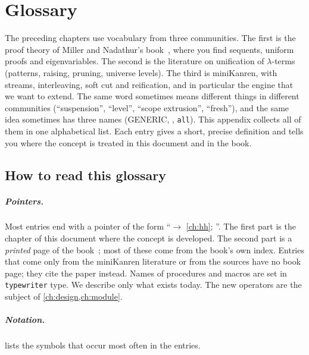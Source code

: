 \chapter{Glossary}\label{app:glossary}

The preceding chapters use vocabulary from three communities. The first is the proof theory of Miller and
Nadathur's book~\cite{MillerNadathur2012}, where you find sequents, uniform proofs and eigenvariables. The second
is the literature on unification of $\lambda$-terms (patterns, raising, pruning, universe levels). The third is
miniKanren, with streams, interleaving, soft cut and reification, and in particular the engine \micro{} that we
want to extend. The same word sometimes means different things in different communities (\enquote{suspension},
\enquote{level}, \enquote{scope extrusion}, \enquote{fresh}), and the same idea sometimes has three names
(GENERIC, , \texttt{all}). This appendix collects all of them in one alphabetical list. Each entry gives a
short, precise definition and tells you where the concept is treated in this document and in the book.

\section{How to read this glossary}\label{sec:glossary-howto}

\paragraph{Pointers.} Most entries end with a pointer of the form
\enquote{$\rightarrow$ \cref{ch:hh}; }. The first part is the chapter of this document where the
concept is developed. The second part is a \emph{printed} page of the book~\cite{MillerNadathur2012}; most of
these come from the book's own index. Entries that come only from the miniKanren literature or from the
\aux{} sources have no book page; they cite the paper instead. Names of \micro{} procedures and macros are set in
\texttt{typewriter} type. We describe only what exists today. The new operators are the subject of
\cref{ch:design,ch:module}.

\paragraph{Notation.}  lists the symbols that occur most often in the entries.

